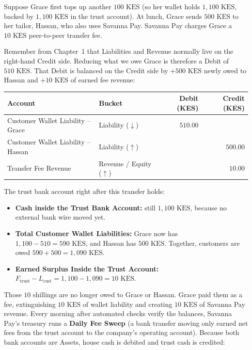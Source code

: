 Suppose Grace first tops up another $100\text{ KES}$ (so her wallet holds $1{,}100\text{ KES}$, backed by $1{,}100\text{ KES}$ in the trust account). At lunch, Grace sends $500\text{ KES}$ to her tailor, Hassan, who also uses Savanna Pay. Savanna Pay charges Grace a $10\text{ KES}$ peer-to-peer transfer fee.

Remember from Chapter~1 that Liabilities and Revenue normally live on the right-hand Credit side. Reducing what we owe Grace is therefore a Debit of $510\text{ KES}$. That Debit is balanced on the Credit side by $+500\text{ KES}$ newly owed to Hassan and $+10\text{ KES}$ of earned fee revenue:

\begin{center}
\small
\begin{tabular}{llrr}
\toprule
\textbf{Account} & \textbf{Bucket} & \textbf{Debit (KES)} & \textbf{Credit (KES)} \\
\midrule
Customer Wallet Liability -- Grace & Liability ($\downarrow$) & $510.00$ & \\
Customer Wallet Liability -- Hassan & Liability ($\uparrow$) & & $500.00$ \\
Transfer Fee Revenue & Revenue / Equity ($\uparrow$) & & $10.00$ \\
\bottomrule
\end{tabular}
\end{center}

The trust bank account right after this transfer holds:
\begin{itemize}
  \item \textbf{Cash inside the Trust Bank Account:} still $1{,}100\text{ KES}$, because no external bank wire moved yet.
  \item \textbf{Total Customer Wallet Liabilities:} Grace now has $1{,}100 - 510 = 590\text{ KES}$, and Hassan has $500\text{ KES}$. Together, customers are owed $590 + 500 = 1{,}090\text{ KES}$.
  \item \textbf{Earned Surplus Inside the Trust Account:} $F_{\text{trust}} - L_{\text{cust}} = 1{,}100 - 1{,}090 = 10\text{ KES}$.
\end{itemize}

Those $10$ shillings are no longer owed to Grace or Hassan. Grace paid them as a fee, extinguishing $10\text{ KES}$ of wallet liability and creating $10\text{ KES}$ of Savanna Pay revenue. Every morning after automated checks verify the balances, Savanna Pay's treasury runs a \textbf{Daily Fee Sweep} (a bank transfer moving only earned net fees from the trust account to the company's operating account). Because both bank accounts are Assets, house cash is debited and trust cash is credited:

